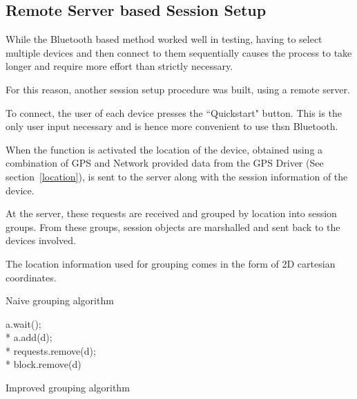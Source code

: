 \subsection{Remote Server based Session Setup}
\label{quickstart}
While the Bluetooth based method worked well in testing, having to select multiple devices and then connect to them sequentially causes the process to take longer and require more effort than strictly necessary.

For this reason, another session setup procedure was built, using a remote server.

To connect, the user of each device presses the ``Quickstart" button. This is the only user input necessary and is hence more convenient to use thsn Bluetooth.

When the function is activated the location of the device, obtained using a combination of GPS and Network provided data from the GPS Driver (See section~\ref{location}), is sent to the server along with the session information of the device.

At the server, these requests are received and grouped by location into session groups. From these groups, session objects are marshalled and sent back to the devices involved.

The location information used for grouping comes in the form of 2D cartesian coordinates.

\begin{algorithm}
\caption{Naive grouping algorithm}
\label{naiveGroup}
\end{algorithm}

\begin{algorithm}
 {
 a.wait();\\*
  {
   {
    {
    a.add(d);\\*
    requests.remove(d);\\*
    block.remove(d)
   }
  }
 }
}
\caption{Improved grouping algorithm}
\label{efficientGroup}
\end{algorithm}

